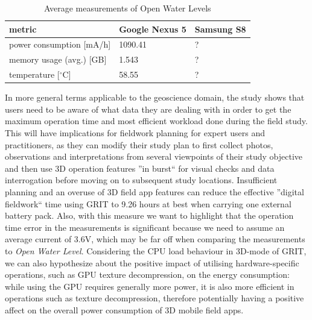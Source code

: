 \documentclass[review]{elsarticle}
\begin{document}
\begin{center}
\begin{longtable}[HT]{| l | p{2.5cm} | p{2.5cm} |}
	\caption{Average measurements of Open Water Levels}
	\label{table:power:OWL}
	\endhead
		\hline
		metric & Google Nexus 5 & Samsung S8 \\ \hline
		power consumption [mA/h] & 1090.41 & ? \\ \hline
		memory usage (avg.) [GB] & 1.543 & ? \\ \hline
		temperature [$^{\circ}$C] & 58.55 & ? \\ \hline
\end{longtable}
\end{center}

In more general terms applicable to the geoscience domain, the study shows that users need to be aware of what data they are dealing with in order to get the maximum operation time and most efficient workload done during the field study. This will have implications for fieldwork planning for expert users and practitioners, as they can modify their study plan to first collect photos, observations and interpretations from several viewpoints of their study objective and then use 3D operation features ''in burst`` for visual checks and data interrogation before moving on to subsequent study locations. Insufficient planning and an overuse of 3D field app features can reduce the effective ''digital fieldwork`` time using \gls{GRIT} to 9.26 hours at best when carrying one external battery pack. Also, with this measure we want to highlight that the operation time error in the measurements is significant because we need to assume an average current of 3.6V, which may be far off when comparing the measurements to \textit{Open Water Level}. Considering the \gls{CPU} load behaviour in 3D-mode of \gls{GRIT}, we can also hypothesize about the positive impact of utilising hardware-specific operations, such as \gls{GPU} texture decompression, on the energy consumption: while using the \gls{GPU} requires generally more power, it is also more efficient in operations such as texture decompression, therefore potentially having a positive affect on the overall power consumption of 3D mobile field apps.
\end{document}
